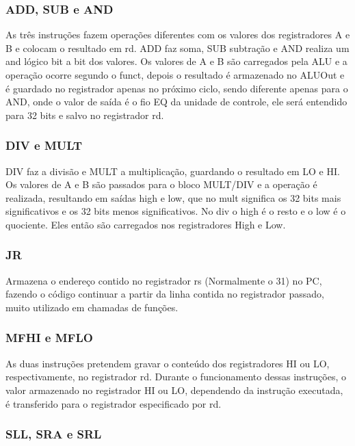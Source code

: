  \subsubsection{ADD, SUB e AND}

As três instruções fazem operações diferentes com os valores dos registradores A e B e colocam o resultado em rd. ADD faz soma, SUB subtração e AND realiza um and lógico bit a bit dos valores. Os valores de A e B são carregados pela ALU e a operação ocorre segundo o funct, depois o resultado é armazenado no ALUOut e é guardado no registrador apenas no próximo ciclo, sendo diferente apenas para o AND, onde o valor de saída é o fio EQ da unidade de controle, ele será entendido para 32 bits e salvo no registrador rd.

 \subsubsection{DIV e MULT}
 
DIV faz a divisão e MULT a multiplicação, guardando o resultado em LO e HI. Os valores de A e B são passados para o bloco MULT/DIV e a operação é realizada, resultando em saídas high e low, que no mult significa os 32 bits mais significativos e os 32 bits menos significativos. No div o high é o resto e o low é o quociente. Eles então são carregados nos registradores High e Low.

 \subsubsection{JR}

Armazena o endereço contido no registrador rs (Normalmente o 31) no PC, fazendo o código continuar a partir da linha contida no registrador passado, muito utilizado em chamadas de funções.

 \subsubsection{MFHI e MFLO}
 
As duas instruções pretendem gravar o conteúdo dos registradores HI ou LO, respectivamente, no registrador rd. Durante o funcionamento dessas instruções, o valor armazenado no registrador HI ou LO, dependendo da instrução executada, é transferido para o registrador especificado por rd. 

\subsubsection{SLL, SRA e SRL}

